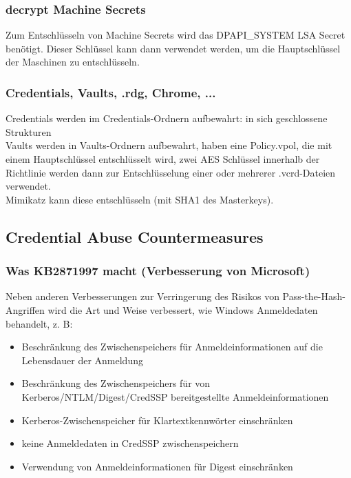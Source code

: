 \subsubsection{decrypt Machine Secrets}
Zum Entschlüsseln von Machine Secrets wird das DPAPI\_SYSTEM LSA Secret benötigt. Dieser Schlüssel kann dann verwendet werden, um die Hauptschlüssel der Maschinen zu entschlüsseln.

\subsubsection{Credentials, Vaults, .rdg, Chrome, ...}
Credentials werden im Credentials-Ordnern aufbewahrt: in sich geschlossene Strukturen\\
Vaults werden in Vaults-Ordnern aufbewahrt, haben eine Policy.vpol, die mit einem Hauptschlüssel entschlüsselt wird, zwei AES Schlüssel innerhalb der Richtlinie werden dann zur Entschlüsselung einer oder mehrerer .vcrd-Dateien verwendet.\\
Mimikatz kann diese entschlüsseln (mit SHA1 des Masterkeys). %

\subsection{Credential Abuse Countermeasures}

\subsubsection{Was KB2871997 macht (Verbesserung von Microsoft)}
Neben anderen Verbesserungen zur Verringerung des Risikos von Pass-the-Hash-Angriffen wird die Art und Weise verbessert, wie Windows Anmeldedaten behandelt, z. B:
\begin{itemize}
    \item Beschränkung des Zwischenspeichers für Anmeldeinformationen auf die Lebensdauer der Anmeldung
    \item Beschränkung des Zwischenspeichers für von Kerberos/NTLM/Digest/CredSSP bereitgestellte Anmeldeinformationen
    \item Kerberos-Zwischenspeicher für Klartextkennwörter einschränken
    \item keine Anmeldedaten in CredSSP zwischenspeichern
    \item Verwendung von Anmeldeinformationen für Digest einschränken
\end{itemize}

